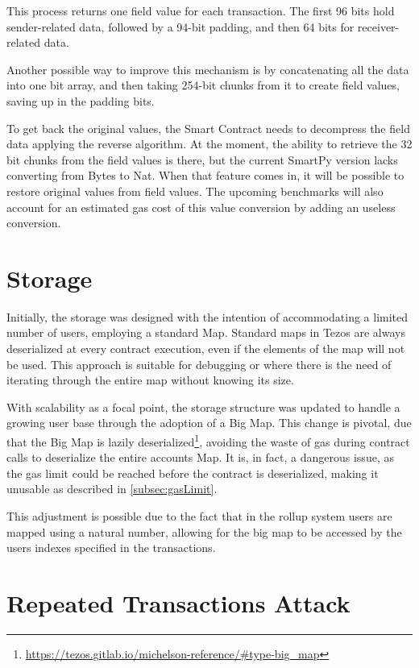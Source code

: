 This process returns one field value for each transaction. The first 96 bits hold sender-related data, followed by a 94-bit padding, and then 64 bits for receiver-related data.

Another possible way to improve this mechanism is by concatenating all the data into one bit array, and then taking 254-bit chunks from it to create field values, saving up in the padding bits.

To get back the original values, the Smart Contract needs to decompress the field data applying the reverse algorithm. At the moment, the ability to retrieve the 32 bit chunks from the field values is there, but the current SmartPy version lacks converting from Bytes to Nat. When that feature comes in, it will be possible to restore original values from field values. The upcoming benchmarks will also account for an estimated gas cost of this value conversion by adding an useless conversion.

\section{Storage\label{sec:5_storage}}

Initially, the storage was designed with the intention of accommodating a limited number of users, employing a standard Map. Standard maps in Tezos are always deserialized at every contract execution, even if the elements of the map will not be used. This approach is suitable for debugging or where there is the need of iterating through the entire map without knowing its size.

With scalability as a focal point, the storage structure was updated to handle a growing user base through the adoption of a Big Map. This change is pivotal, due that the Big Map is lazily deserialized\footnote{\url{https://tezos.gitlab.io/michelson-reference/\#type-big_map}}, avoiding the waste of gas during contract calls to deserialize the entire accounts Map. It is, in fact, a dangerous issue, as the gas limit could be reached before the contract is deserialized, making it unusable as described in \ref{subsec:gasLimit}.

This adjustment is possible due to the fact that in the rollup system users are mapped using a natural number, allowing for the big map to be accessed by the users indexes specified in the transactions.

\section{Repeated Transactions Attack}
\label{sec:repeatedtransactionsattack}

